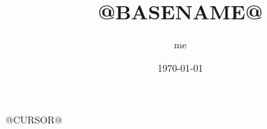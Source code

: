 \documentclass[12pt]{article}
\title{@BASENAME@}
\date{\today}
\author{me}
\begin{document}
\maketitle


@CURSOR@



\begin{thebibliography}{9}

\end{thebibliography}

\end{document}
